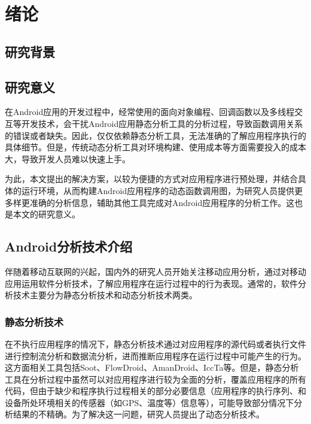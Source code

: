 \chapter {绪论}
\label{ch1}

\section{研究背景}
\section{研究意义}

在Android应用的开发过程中，经常使用的面向对象编程、回调函数以及多线程交互等开发技术，会干扰Android应用静态分析工具的分析过程，导致函数调用关系的错误或者缺失。因此，仅仅依赖静态分析工具，无法准确的了解应用程序执行的具体细节。但是，传统动态分析工具对环境构建、使用成本等方面需要投入的成本大，导致开发人员难以快速上手。

为此，本文提出的解决方案，以较为便捷的方式对应用程序进行预处理，并结合具体的运行环境，从而构建Android应用程序的动态函数调用图，为研究人员提供更多样更准确的分析信息，辅助其他工具完成对Android应用程序的分析工作。这也是本文的研究意义。
\section{Android分析技术介绍}

伴随着移动互联网的兴起，国内外的研究人员开始关注移动应用分析，通过对移动应用运用软件分析技术，了解应用程序在运行过程中的行为表现。通常的，软件分析技术主要分为静态分析技术和动态分析技术两类。

\subsection{静态分析技术}
在不执行应用程序的情况下，静态分析技术通过对应用程序的源代码或者执行文件进行控制流分析和数据流分析，进而推断应用程序在运行过程中可能产生的行为。这方面相关工具包括Soot、FlowDroid、AmanDroid、IccTa等。但是，静态分析工具在分析过程中虽然可以对应用程序进行较为全面的分析，覆盖应用程序的所有代码，但由于缺少和程序执行过程相关的部分必要信息（应用程序的执行序列、和设备所处环境相关的传感器（如GPS、温度等）信息等），可能导致部分情况下分析结果的不精确。为了解决这一问题，研究人员提出了动态分析技术。

